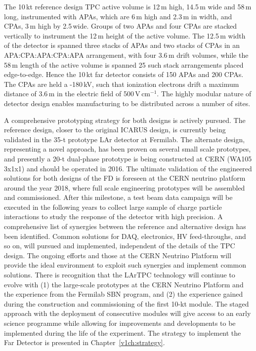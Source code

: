 The 10\,kt reference design TPC active volume is 12\,m high, 14.5\,m wide and 
58\,m long, instrumented with APAs, 
which are 6\,m high and 2.3\,m in width, and CPAs, 3\,m high by 2.5\,wide. Groups of
two APAs and four CPAs are stacked vertically to instrument 
the 12\,m height of the active volume. The 12.5\,m width of the detector is 
spanned three stacks of APAs and two stacks of CPAs in an APA:CPA:APA:CPA:APA
arrangement, with four 3.6\,m drift volumes, while the 58\,m length of the active volume
is spanned 25 such stack arrangements placed edge-to-edge. Hence the 10\,kt 
far detector consists of 150 APAs and 200 CPAs. The CPAs are held a -180\,kV, such that 
ionization electrons drift a maximum distance of 3.6\,m in the electric field of 500\,V\,cm$^{-1}$.
The highly modular nature of detector design enables manufacturing to be distributed across a number of sites.

A  comprehensive prototyping strategy for both designs is actively pursued.
The reference design, closer to the original ICARUS design, is currently being validated in the 35-t prototype LAr detector at Fermilab.  The alternate design, representing a novel approach, has been proven on several
small scale prototypes, and presently
a 20-t dual-phase prototype is being constructed at CERN (WA105 3x1x1) and should be operated in 2016. 
The ultimate validation of the engineered solutions for both designs of the FD is foreseen at 
the CERN neutrino platform around the year 2018, where full scale engineering prototypes will be 
assembled and commissioned. After this milestone, a test beam data 
campaign will be executed in the following years to collect large sample of charge particle interactions
to study the response of the detector with high precision.
A comprehensive list of synergies between the reference and alternative design has been identified. Common solutions for DAQ, electronics, HV feed-throughs, and so on, will pursued and implemented, independent of the details of the TPC design. The ongoing efforts and those at the CERN Neutrino Platform will
provide the ideal environment to exploit such synergies and implement common solutions.
There is recognition that the LArTPC technology will continue to evolve with (1) the large-scale prototypes at the CERN Neutrino Platform and the experience from the Fermilab SBN program, and (2) the experience gained during the construction and commissioning of the first 10-kt module. 
The staged approach with the deployment of consecutive modules will
give access to an early science programme while allowing for improvements and developments to be implemented during the life of the experiment.
The strategy to implement
the Far Detector is presented in Chapter~\ref{v1ch:strategy}.

